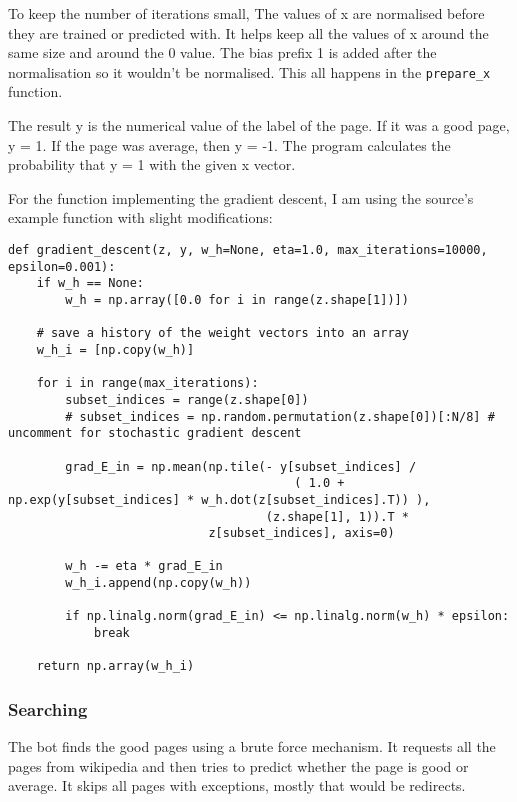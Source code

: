 To keep the number of iterations small, The values of x are normalised before they are trained or predicted with. It helps keep all the values of x around the same size and around the 0 value. The bias prefix 1 is added after the normalisation so it wouldn't be normalised. This all happens in the \verb;prepare_x; function.

The result y is the numerical value of the label of the page. If it was a good page, y = 1. If the page was average, then y = -1. The program calculates the probability that y = 1 with the given x vector.

For the function implementing the gradient descent, I am using the source's example function with slight modifications:
\begin{verbatim}
def gradient_descent(z, y, w_h=None, eta=1.0, max_iterations=10000, epsilon=0.001):
    if w_h == None:
        w_h = np.array([0.0 for i in range(z.shape[1])])
    
    # save a history of the weight vectors into an array
    w_h_i = [np.copy(w_h)]
    
    for i in range(max_iterations):
        subset_indices = range(z.shape[0])
        # subset_indices = np.random.permutation(z.shape[0])[:N/8] # uncomment for stochastic gradient descent
        
        grad_E_in = np.mean(np.tile(- y[subset_indices] /
                                        ( 1.0 + np.exp(y[subset_indices] * w_h.dot(z[subset_indices].T)) ),
                                    (z.shape[1], 1)).T * 
                            z[subset_indices], axis=0)
        
        w_h -= eta * grad_E_in
        w_h_i.append(np.copy(w_h))
        
        if np.linalg.norm(grad_E_in) <= np.linalg.norm(w_h) * epsilon:
            break
    
    return np.array(w_h_i)
\end{verbatim}

\subsubsection{Searching}
The bot finds the good pages using a brute force mechanism. It requests all the pages from wikipedia and then tries to predict whether the page is good or average. It skips all pages with exceptions, mostly that would be redirects.
